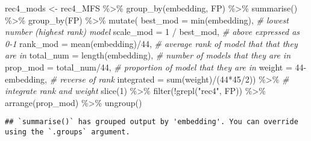 \documentclass[
]{article}
\newenvironment{Shaded}{\begin{snugshade}}{\end{snugshade}}
\newcommand{\AttributeTok}[1]{\textcolor[rgb]{0.77,0.63,0.00}{#1}}
\newcommand{\CommentTok}[1]{\textcolor[rgb]{0.56,0.35,0.01}{\textit{#1}}}
\newcommand{\DecValTok}[1]{\textcolor[rgb]{0.00,0.00,0.81}{#1}}
\newcommand{\FunctionTok}[1]{\textcolor[rgb]{0.00,0.00,0.00}{#1}}
\newcommand{\NormalTok}[1]{#1}
\newcommand{\OtherTok}[1]{\textcolor[rgb]{0.56,0.35,0.01}{#1}}
\newcommand{\SpecialCharTok}[1]{\textcolor[rgb]{0.00,0.00,0.00}{#1}}
\newcommand{\StringTok}[1]{\textcolor[rgb]{0.31,0.60,0.02}{#1}}
\begin{document}
\begin{Shaded}
\begin{Highlighting}[]
\NormalTok{rec4\_mods }\OtherTok{\textless{}{-}}\NormalTok{ rec4\_MFS }\SpecialCharTok{\%\textgreater{}\%}
  \FunctionTok{group\_by}\NormalTok{(embedding, FP) }\SpecialCharTok{\%\textgreater{}\%} 
  \FunctionTok{summarise}\NormalTok{() }\SpecialCharTok{\%\textgreater{}\%} 
  \FunctionTok{group\_by}\NormalTok{(FP) }\SpecialCharTok{\%\textgreater{}\%} 
  \FunctionTok{mutate}\NormalTok{(}
    \AttributeTok{best\_mod =} \FunctionTok{min}\NormalTok{(embedding), }\CommentTok{\# lowest number (highest rank) model}
    \AttributeTok{scale\_mod =} \DecValTok{1} \SpecialCharTok{/}\NormalTok{ best\_mod, }\CommentTok{\# above expressed as 0{-}1}
    \AttributeTok{rank\_mod =} \FunctionTok{mean}\NormalTok{(embedding)}\SpecialCharTok{/}\DecValTok{44}\NormalTok{, }\CommentTok{\# average rank of model that that they are in}
    \AttributeTok{total\_num =} \FunctionTok{length}\NormalTok{(embedding), }\CommentTok{\# number of models that they are in}
    \AttributeTok{prop\_mod =}\NormalTok{ total\_num}\SpecialCharTok{/}\DecValTok{44}\NormalTok{, }\CommentTok{\# proportion of model that they are in }
    \AttributeTok{weight =} \DecValTok{44}\SpecialCharTok{{-}}\NormalTok{embedding, }\CommentTok{\# reverse of rank}
    \AttributeTok{integrated =} \FunctionTok{sum}\NormalTok{(weight)}\SpecialCharTok{/}\NormalTok{(}\DecValTok{44}\SpecialCharTok{*}\DecValTok{45}\SpecialCharTok{/}\DecValTok{2}\NormalTok{)) }\SpecialCharTok{\%\textgreater{}\%} \CommentTok{\# integrate rank and weight }
  \FunctionTok{slice}\NormalTok{(}\DecValTok{1}\NormalTok{) }\SpecialCharTok{\%\textgreater{}\%} 
  \FunctionTok{filter}\NormalTok{(}\SpecialCharTok{!}\FunctionTok{grepl}\NormalTok{(}\StringTok{"rec4"}\NormalTok{, FP)) }\SpecialCharTok{\%\textgreater{}\%} 
  \FunctionTok{arrange}\NormalTok{(prop\_mod) }\SpecialCharTok{\%\textgreater{}\%} 
  \FunctionTok{ungroup}\NormalTok{()}
\end{Highlighting}
\end{Shaded}

\begin{verbatim}
## `summarise()` has grouped output by 'embedding'. You can override using the `.groups` argument.
\end{verbatim}

\begin{Shaded}
\end{Shaded}
\end{document}
